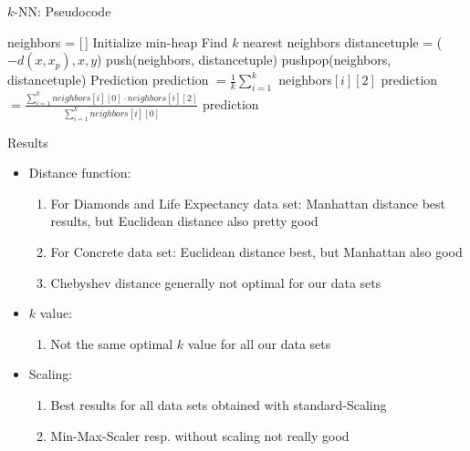 \documentclass[10pt]{beamer}
\begin{document}
    \begin{frame}[fragile]{$k$-NN: Pseudocode}
        \begin{algorithm}[H]
            \caption{$k$-NN-Regressor($k$, distance-fct $d$, weight, $X_{t}$, $Y_{t}$, $x_{p}$)}
			\begin{algorithmic}[1]
			    \State neighbors = [\,]
			    \Comment Initialize min-heap
			    \Comment Find $k$ nearest neighbors
			        \State distance\textunderscore tuple = ($-d(x, x_{p}), x, y$)
			            \State push(neighbors, distance\textunderscore tuple)
			        \Else
			            \State pushpop(neighbors, distance\textunderscore tuple)
			        \EndIf
			    \EndFor
			    \Comment Prediction
			        \State prediction $= \frac{1}{k}\sum_{i=1}^k$ neighbors$[i][2]$
			        \State prediction $= \frac{\sum_{i=1}^k neighbors[i][0] \cdot neighbors[i][2]}{\sum_{i=1}^k neighbors[i][0]}$
			    \EndIf
			    \State \Return prediction
			\end{algorithmic}
		\end{algorithm}
    \end{frame}
    
    \begin{frame}[fragile]{Results}
        \begin{itemize}
            \item Distance function:
                \begin{enumerate}
                    \item For Diamonds and Life Expectancy data set: Manhattan distance best results, but Euclidean distance also pretty good
                    \item For Concrete data set: Euclidean distance best, but Manhattan also good
                    \item Chebyshev distance generally not optimal for our data sets
                \end{enumerate}
            \item $k$ value:
                \begin{enumerate}
                    \item Not the same optimal $k$ value for all our data sets
                \end{enumerate}
            
            \item Scaling:
                \begin{enumerate}
                    \item Best results for all data sets obtained with standard-Scaling
                    \item Min-Max-Scaler resp. without scaling not really good
                \end{enumerate}
        \end{itemize}
    \end{frame}
    
\end{document}
